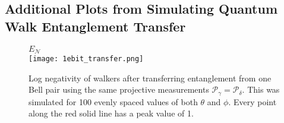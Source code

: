 \begin{appendices}


\section{Additional Plots from Simulating Quantum Walk Entanglement Transfer}
\label{appendix:qw_figures}
\setcounter{figure}{0}
\renewcommand{\thefigure}{A.\arabic{figure}}
\begin{figure}[h]
    \centering
    $E_\mathcal{N}$\\
    \texttt{[image: 1ebit\_transfer.png]}
    \caption{Log negativity of walkers after transferring entanglement from one Bell pair using the same projective measurements $\mathcal{P}_\gamma = \mathcal{P}_\delta$. This was simulated for 100 evenly spaced values of both $\theta$ and $\phi$. Every point along the red solid line has a peak value of 1.}
    \label{fig:1ebit_transfer}
\end{figure}


\end{appendices}
